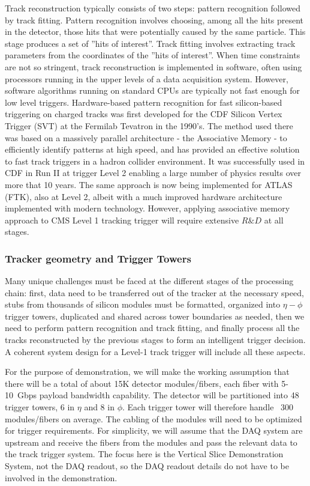 \noindent Track reconstruction typically consists of two steps: pattern recognition followed by track fitting. Pattern recognition involves choosing, among all the hits present in the detector, those hits that were potentially caused by the same particle. This stage produces a set of ”hits of interest”. Track fitting involves extracting track parameters from the coordinates of the ”hits of interest”. When time constraints are not so stringent, track reconstruction is implemented in software, often using processors running in the upper levels of a data acquisition system. However, software algorithms running on standard CPUs are typically not fast enough for low level triggers. 
 Hardware-based pattern recognition for fast silicon-based triggering on charged tracks was first developed for the CDF Silicon Vertex Trigger (SVT) at the Fermilab Tevatron in the 1990's.  The method used there~\cite{bib:Rist-89} was based on a massively parallel architecture - the Associative Memory - to efficiently identify patterns at high speed, and has provided an effective solution to fast track triggers in a hadron collider environment. It was successfully used in CDF in Run II at trigger Level 2 enabling a large number of physics results over more that 10 years. The same approach is now being implemented for ATLAS (FTK), also at Level 2, albeit with a much improved hardware architecture implemented with modern technology. However, applying associative memory approach to CMS Level 1 tracking trigger will require extensive $R\&D$ at all stages. 


	


\subsubsection{Tracker geometry and Trigger Towers }

\noindent Many unique challenges must be faced at the different stages of the processing chain: first, data need to be transferred out of the tracker at the necessary speed, stubs from thousands of silicon modules must be formatted, organized into $\eta - \phi$ trigger towers, duplicated and shared across tower boundaries as needed, then we need to perform pattern recognition and track fitting, and finally process all the tracks reconstructed by the previous stages to form an intelligent trigger decision. A coherent system design for a Level-1 track trigger will include all these aspects.

\noindent For the purpose of demonstration, we will make the working assumption that there will be a total of about 15K detector modules/fibers, each fiber with 5-10~Gbps payload bandwidth capability. The detector will be partitioned into 48 trigger towers, 6 in $\eta$ and 8 in $\phi$. Each trigger tower will therefore handle ~300 modules/fibers on average. The cabling of the modules will need to be optimized for trigger requirements. For simplicity, we will assume that the DAQ system are upstream and receive the fibers from the modules and pass the relevant data to the track trigger system. The focus here is the Vertical Slice Demonstration System, not the DAQ readout, so the DAQ readout details do not have to be involved in the demonstration.


